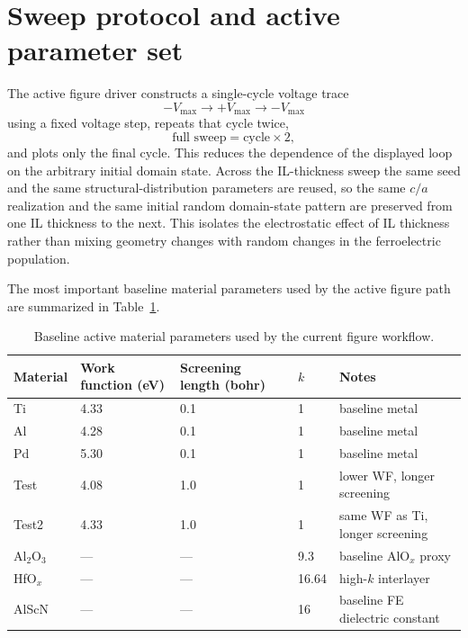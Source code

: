 \documentclass[11pt]{article}
\begin{document}
\section{Sweep protocol and active parameter set}

The active figure driver constructs a single-cycle voltage trace
\begin{equation}
-V_{\max} \rightarrow +V_{\max} \rightarrow -V_{\max}
\label{eq:single-cycle-mifm}
\end{equation}
using a fixed voltage step, repeats that cycle twice,
\begin{equation}
\text{full sweep} = \text{cycle} \times 2,
\label{eq:two-cycles-mifm}
\end{equation}
and plots only the final cycle. This reduces the dependence of the displayed
loop on the arbitrary initial domain state. Across the IL-thickness sweep the
same seed and the same structural-distribution parameters are reused, so the
same $c/a$ realization and the same initial random domain-state pattern are
preserved from one IL thickness to the next. This isolates the electrostatic
effect of IL thickness rather than mixing geometry changes with random changes
in the ferroelectric population.

The most important baseline material parameters used by the active figure path
are summarized in Table~\ref{tab:materials-active-mifm}.

\begin{table}[H]
\centering
\caption{Baseline active material parameters used by the current figure workflow.}
\label{tab:materials-active-mifm}
\begin{tabular}{@{}lllll@{}}
\toprule
Material & Work function (eV) & Screening length (bohr) & $k$ & Notes \\
\midrule
Ti & 4.33 & 0.1 & 1 & baseline metal \\
Al & 4.28 & 0.1 & 1 & baseline metal \\
Pd & 5.30 & 0.1 & 1 & baseline metal \\
Test & 4.08 & 1.0 & 1 & lower WF, longer screening \\
Test2 & 4.33 & 1.0 & 1 & same WF as Ti, longer screening \\
Al$_2$O$_3$ & --- & --- & 9.3 & baseline AlO$_x$ proxy \\
HfO$_x$ & --- & --- & 16.64 & high-$k$ interlayer \\
AlScN & --- & --- & 16 & baseline FE dielectric constant \\
\bottomrule
\end{tabular}
\end{table}
\end{document}
